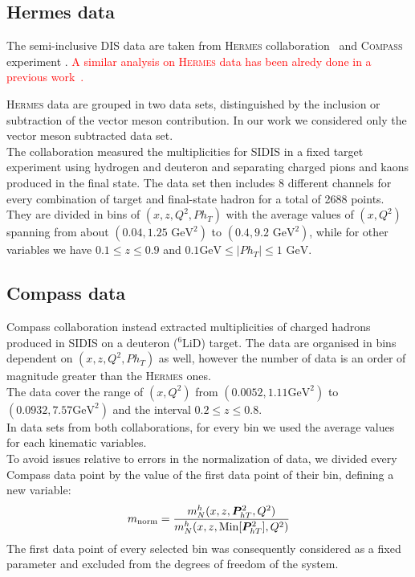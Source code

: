 \documentclass[aps,preprintnumbers,showpacs,nofootinbib,superscriptaddress,floatfix]{revtex4}
\newcommand{\compass}{\textsc{Compass }}
\newcommand{\Tperp}{T}
\begin{document}
\subsection{Hermes data}
\label{ss:hermes}

The semi-inclusive DIS data are taken from \textsc{Hermes} collaboration~\cite{Airapetian:2012ki} and \compass experiment \cite{Adolph:2013stb}.
\textcolor{red}{A similar analysis on \textsc{Hermes} data has been alredy done in a previous work~\cite{Signori:2013mda}.} 

\textsc{Hermes} data are grouped in two data sets, distinguished by the inclusion or subtraction of the vector meson contribution. In our work we considered only the vector meson subtracted data set.\\
The collaboration measured the multiplicities for SIDIS in a fixed target experiment using hydrogen and deuteron and separating charged pions and kaons produced in the final state. The data set then includes 8 different channels for every combination of target and final-state hadron for a total of 2688 points.\\
They are divided in bins of $(x,z,Q^2,Ph_T)$ with the average values of $(x,Q^2)$ spanning from about $(0.04, 1.25\text{ GeV}^2)$ to $(0.4, 9.2\text{ GeV}^2)$, while for other variables we have $0.1\leq z\leq 0.9$ and $0.1 \text{GeV} \leq \vert Ph_T \vert \leq 1 \text{ GeV}$.

\subsection{Compass data}
\label{ss:compass}

Compass collaboration instead extracted multiplicities of charged hadrons produced in SIDIS on a deuteron ($^6\text{LiD}$) target. The data are organised in bins dependent on $(x,z,Q^2,Ph_T)$ as well, however the number of data is an order of magnitude greater than the \textsc{Hermes} ones.\\
The data cover the range of $(x,Q^2)$ from $(0.0052, 1.11\text{GeV}^2)$ to $(0.0932, 7.57\text{GeV}^2)$ and the interval $0.2 \leq z \leq 0.8$.\\
In data sets from both collaborations, for every bin we used the average values for each kinematic variables.\\

To avoid issues relative to errors in the normalization of data, we divided every Compass data point by the value of the first data point of their bin, defining a new variable:
\begin{equation}
m_{\text{norm}} = \frac{m_N^h(x,z,\bm{P}_{h\Tperp}^2, Q^2)}{m_N^h (x,z,{\rm Min}[\bm{P}_{h\Tperp}^2], Q^2)}
\label{eq:mult_norm}
\end{equation}
The first data point of every selected bin  was consequently considered as a fixed parameter and excluded from the degrees of freedom of the system.
\end{document}
